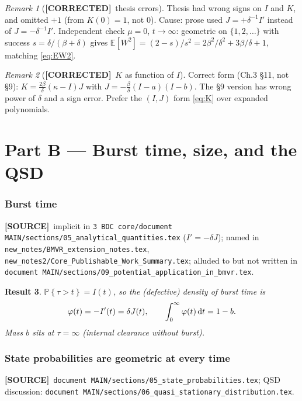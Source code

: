 \documentclass[11pt,a4paper]{article}
\newcommand{\dd}{{\rm d}}
\newcommand{\E}{\mathbb{E}}
\newcommand{\Prob}[1]{\mathbb{P}\!\left\{#1\right\}}
\theoremstyle{plain}
\newtheorem{result}{Result}[section]
\theoremstyle{definition}
\theoremstyle{remark}
\newtheorem{remark}[result]{Remark}
\newcommand{\COR}{\textcolor{green!40!black}{\textbf{[CORRECTED]}}}
\newcommand{\SOURCE}{\textcolor{gray!50!black}{\textbf{[SOURCE]}}}
\begin{document}
\begin{remark}[\COR\ thesis errors]
Thesis had wrong signs on $I$ and $K$, and omitted $+1$ (from $K(0)=1$, not $0$).
Cause: prose used $J=+\delta^{-1}I'$ instead of $J=-\delta^{-1}I'$.
Independent check $\mu=0$, $t\to\infty$: geometric on $\{1,2,\ldots\}$ with
success $s=\delta/(\beta+\delta)$ gives
$\E[W^2]=(2-s)/s^2=2\beta^2/\delta^2+3\beta/\delta+1$, matching \eqref{eq:EW2}.
\end{remark}

\begin{remark}[\COR\ $K$ as function of $I$]
Correct form (Ch.3 \S11, not \S9):
$K=\frac{2\beta}{\delta}(\kappa-I)J$ with $J=-\frac{\beta}{\delta}(I-a)(I-b)$.
The \S9 version has wrong power of $\delta$ and a sign error. Prefer the
$(I,J)$ form \eqref{eq:K} over expanded polynomials.
\end{remark}

\part*{Part B --- Burst time, size, and the QSD}

\section{Burst time}
\label{sec:burst}
\SOURCE\
implicit in
\texttt{3 BDC core/document MAIN/sections/05\_analytical\_quantities.tex}
($I'=-\delta J$);
named in
\texttt{new\_notes/BMVR\_extension\_notes.tex},
\texttt{new\_notes2/Core\_Publishable\_Work\_Summary.tex};
alluded to but not written in
\texttt{document MAIN/sections/09\_potential\_application\_in\_bmvr.tex}.

\begin{result}
$\Prob{\tau>t}=I(t)$, so the (defective) density of burst time is
\[
\varphi(t)=-I'(t)=\delta J(t),\qquad
\int_0^\infty\varphi(t)\,\dd t=1-b.
\]
Mass $b$ sits at $\tau=\infty$ (internal clearance without burst).
\end{result}

\section{State probabilities are geometric at every time}
\label{sec:pn}
\SOURCE\
\texttt{document MAIN/sections/05\_state\_probabilities.tex};
QSD discussion:
\texttt{document MAIN/sections/06\_quasi\_stationary\_distribution.tex}.
\end{document}
